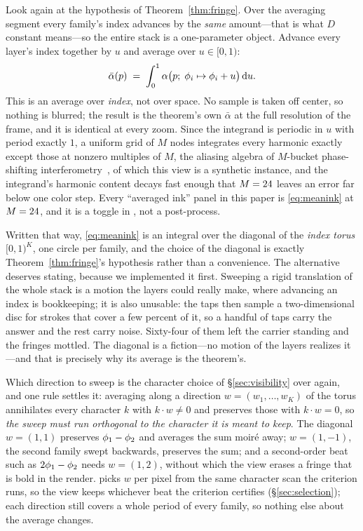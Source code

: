 Look again at the hypothesis of Theorem~\ref{thm:fringe}. Over the averaging
segment every family's index advances by the \emph{same} amount---that is what
$D$ constant means---so the entire stack is a one-parameter object. Advance every
layer's index together by $u$ and average over $u\in[0,1)$:
\begin{equation}
  \bar\alpha(p) \;=\; \int_0^1 \alpha\big(p;\; \phi_i \mapsto \phi_i + u\big)\,\mathrm{d}u.
  \label{eq:meanink}
\end{equation}
This is an average over \emph{index}, not over space. No sample is taken off
center, so nothing is blurred; the result is the theorem's own $\bar\alpha$ at the
full resolution of the frame, and it is identical at every zoom. Since the
integrand is periodic in $u$ with period exactly $1$, a uniform grid of $M$ nodes
integrates every harmonic exactly except those at nonzero multiples of $M$,
the aliasing algebra of $M$-bucket phase-shifting
interferometry~\cite{Bruning1974Digital, Surrel1996Design}, of which this view
is a synthetic instance, and the integrand's harmonic content decays fast
enough that $M=24$ leaves an error far below one color step. Every
``averaged ink'' panel in this paper is \eqref{eq:meanink} at $M=24$, and
it is a toggle in \Moire{}, not a post-process.

Written that way, \eqref{eq:meanink} is an integral over the diagonal of the
\emph{index torus} $[0,1)^K$, one circle per family, and the choice of the
diagonal is exactly Theorem~\ref{thm:fringe}'s hypothesis rather than a
convenience. The alternative deserves stating, because we implemented it
first. Sweeping a rigid translation of the whole stack is a motion the layers
could really make, where advancing an index is bookkeeping; it is also unusable:
the taps then sample a two-dimensional disc for strokes that cover a few percent
of it, so a handful of taps carry the answer and the rest carry noise. Sixty-four
of them left the carrier standing and the fringes mottled. The diagonal is a
fiction---no motion of the layers realizes it---and that is precisely why
its average is the theorem's.

Which direction to sweep is the character choice of \S\ref{sec:visibility} over
again, and one rule settles it: averaging along a direction
$w=(w_1,\dots,w_K)$ of the torus annihilates every character
$k$ with $k\cdot w\neq0$ and preserves those with $k\cdot w=0$, so \emph{the
sweep must run orthogonal to the character it is meant to keep}. The diagonal
$w=(1,1)$ preserves $\phi_1-\phi_2$ and averages the sum moir\'e away;
$w=(1,-1)$, the second family swept backwards, preserves the sum; and a
second-order beat such as $2\phi_1-\phi_2$ needs $w=(1,2)$, without which the
view erases a fringe that is bold in the render. \Moire{} picks $w$ per pixel
from the same character scan the criterion runs, so the view keeps whichever
beat the criterion certifies (\S\ref{sec:selection}); each direction still
covers a whole period of every family, so nothing else about the average
changes.

